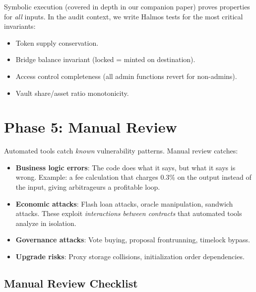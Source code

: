 \documentclass[11pt,a4paper]{article}
\begin{document}
Symbolic execution (covered in depth in our companion paper) proves properties for
\emph{all} inputs. In the audit context, we write Halmos tests for the most critical
invariants:

\begin{itemize}[nosep]
  \item Token supply conservation.
  \item Bridge balance invariant (locked = minted on destination).
  \item Access control completeness (all admin functions revert for non-admins).
  \item Vault share/asset ratio monotonicity.
\end{itemize}

\section{Phase 5: Manual Review}

Automated tools catch \emph{known} vulnerability patterns. Manual review catches:

\begin{itemize}[nosep]
  \item \textbf{Business logic errors}: The code does what it says, but what it says is
    wrong. Example: a fee calculation that charges 0.3\% on the output instead of the
    input, giving arbitrageurs a profitable loop.
  \item \textbf{Economic attacks}: Flash loan attacks, oracle manipulation, sandwich
    attacks. These exploit \emph{interactions between contracts} that automated tools
    analyze in isolation.
  \item \textbf{Governance attacks}: Vote buying, proposal frontrunning, timelock bypass.
  \item \textbf{Upgrade risks}: Proxy storage collisions, initialization order dependencies.
\end{itemize}

\subsection{Manual Review Checklist}
\end{document}
